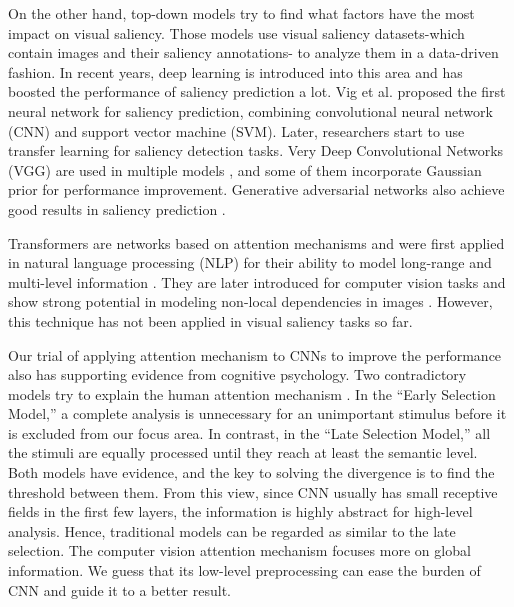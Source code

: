 \documentclass[12pt]{article}
\begin{document}
On the other hand, top-down models try to find what factors have the most impact on visual saliency. Those models use visual saliency datasets-which contain images and their saliency annotations-
to analyze them in a data-driven fashion.
In recent years, deep learning is introduced into this area and has boosted the performance of saliency prediction a lot.
Vig et al. \cite{vigLargeScaleOptimizationHierarchical2014} proposed the first neural network for saliency prediction, combining convolutional neural network (CNN) and support vector machine (SVM). Later, researchers start to use transfer learning for saliency detection tasks. Very Deep Convolutional Networks (VGG) are used in multiple models \cite{kruthiventiDeepFixFullyConvolutional2015, kummererDeepGazeIIReading2016, corniaPredictingHumanEye2018}, and some of them incorporate Gaussian prior for performance improvement.
Generative adversarial networks also achieve good results in saliency prediction \cite{panSalGANVisualSaliency2018, cheHowGazeInfluenced2020}.

Transformers are networks based on attention mechanisms and were first applied in natural language processing (NLP) for their ability to model long-range and multi-level information \cite{bahdanauNeuralMachineTranslation2016a, vaswaniAttentionAllYou2017a}.
They are later introduced for computer vision tasks and show strong potential in modeling non-local dependencies in images \cite{zhangSelfAttentionGenerativeAdversarial2019a}.
However, this technique has not been applied in visual saliency tasks so far.

Our trial of applying attention mechanism to CNNs to improve the performance also has supporting evidence from cognitive psychology. Two contradictory models try to explain the human attention mechanism \cite{gazzaniga2006cognitive}.
In the “Early Selection Model,” a complete analysis is unnecessary for an unimportant stimulus before it is excluded from our focus area. In contrast, in the “Late Selection Model,” all the stimuli are equally processed until they reach at least the semantic level.
Both models have evidence, and the key to solving the divergence is to find the threshold between them. From this view, since CNN usually has small receptive fields in the first few layers, the information is highly abstract for high-level analysis. Hence, traditional models can be regarded as similar to the late selection.
The computer vision attention mechanism focuses more on global information. We guess that its low-level preprocessing can ease the burden of CNN and guide it to a better result.
\end{document}
